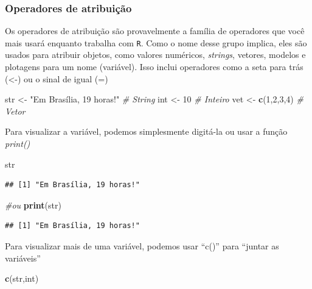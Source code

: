 \documentclass[
]{book}
\newenvironment{Shaded}{\begin{snugshade}}{\end{snugshade}}
\newcommand{\CommentTok}[1]{\textcolor[rgb]{0.56,0.35,0.01}{\textit{#1}}}
\newcommand{\DecValTok}[1]{\textcolor[rgb]{0.00,0.00,0.81}{#1}}
\newcommand{\KeywordTok}[1]{\textcolor[rgb]{0.13,0.29,0.53}{\textbf{#1}}}
\newcommand{\NormalTok}[1]{#1}
\newcommand{\StringTok}[1]{\textcolor[rgb]{0.31,0.60,0.02}{#1}}
\theoremstyle{definition}
\theoremstyle{definition}
\theoremstyle{definition}
\theoremstyle{remark}
\begin{document}
\hypertarget{operadores-de-atribuiuxe7uxe3o}{%
\subsubsection{Operadores de atribuição}\label{operadores-de-atribuiuxe7uxe3o}}

Os operadores de atribuição são provavelmente a família de operadores que você mais usará enquanto
trabalha com \texttt{R}. Como o nome desse grupo implica, eles são usados para atribuir objetos, como
valores numéricos, \emph{strings}, vetores, modelos e plotagens para um nome (variável). Isso inclui
operadores como a seta para trás (\textless-) ou o sinal de igual (=)

\begin{Shaded}
\begin{Highlighting}[]
\NormalTok{str <-}\StringTok{ "Em Brasília, 19 horas!"} \CommentTok{# String}
\NormalTok{int <-}\StringTok{ }\DecValTok{10} \CommentTok{# Inteiro}
\NormalTok{vet <-}\StringTok{ }\KeywordTok{c}\NormalTok{(}\DecValTok{1}\NormalTok{,}\DecValTok{2}\NormalTok{,}\DecValTok{3}\NormalTok{,}\DecValTok{4}\NormalTok{) }\CommentTok{# Vetor}
\end{Highlighting}
\end{Shaded}

Para visualizar a variável, podemos simplesmente digitá-la ou usar a função \emph{print()}

\begin{Shaded}
\begin{Highlighting}[]
\NormalTok{str}
\end{Highlighting}
\end{Shaded}

\begin{verbatim}
## [1] "Em Brasília, 19 horas!"
\end{verbatim}

\begin{Shaded}
\begin{Highlighting}[]
\CommentTok{#ou}
\KeywordTok{print}\NormalTok{(str)}
\end{Highlighting}
\end{Shaded}

\begin{verbatim}
## [1] "Em Brasília, 19 horas!"
\end{verbatim}

Para visualizar mais de uma variável, podemos usar ``c()'' para ``juntar as variáveis''

\begin{Shaded}
\begin{Highlighting}[]
\KeywordTok{c}\NormalTok{(str,int)}
\end{Highlighting}
\end{Shaded}
\end{document}
